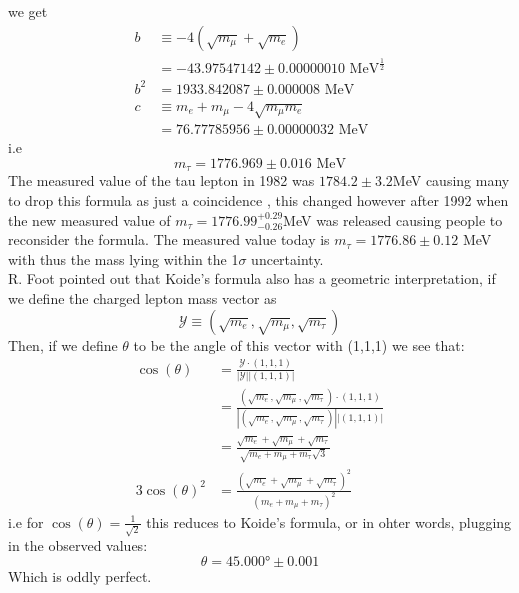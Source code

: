 \documentclass[twoside,twocolumn,11pt]{article} %
\begin{document}
we get 
\begin{align*}
	b &\equiv -4(\sqrt{m_\mu} + \sqrt{m_e})\\
	&= -43.97547142\pm 0.00000010 \text{ MeV}^{\frac{1}{2}}\\
	b^2 &= 1933.842087 \pm 0.000008\text{ MeV}\\
	c &\equiv m_e + m_\mu - 4\sqrt{m_\mu m_e}\\
	&= 76.77785956\pm 0.00000032 \text{ MeV}
\end{align*}
i.e
\begin{equation}
	m_\tau = 1776.969 \pm 0.016\text{ MeV}\label{eq:TauPredictionKoide}
\end{equation}
The measured value of the tau lepton in 1982 was $1784.2\pm 3.2$MeV causing many to drop this formula as just a coincidence \cite{WhatPhysicsKoide}, this changed however after 1992 when the new measured value of $m_\tau = 1776.99^{+0.29}_{-0.26}$MeV was released causing people to reconsider the formula. The measured value today is $m_\tau = 1776.86\pm 0.12$ MeV with thus the mass lying within the 1$\sigma$ uncertainty.   \\
R. Foot \cite{Foot} pointed out that Koide's formula also has a geometric interpretation, if we define the charged lepton mass vector as
\begin{equation}
	\mathcal{Y} \equiv (\sqrt{m_e},\sqrt{m_\mu},\sqrt{m_\tau})
\end{equation}
Then, if we define $\theta$ to be the angle of this vector with (1,1,1) we see that:
\begin{align*}
	\cos(\theta)  &= \frac{\mathcal{Y}\cdot (1,1,1)}{|\mathcal{Y}||(1,1,1)|}\\
	&= \frac{(\sqrt{m_e},\sqrt{m_\mu},\sqrt{m_\tau})\cdot (1,1,1)}{|(\sqrt{m_e},\sqrt{m_\mu},\sqrt{m_\tau})||(1,1,1)|}\\
	&= \frac{\sqrt{m_e} + \sqrt{m_\mu} + \sqrt{m_\tau}}{\sqrt{m_e + m_\mu + m_\tau}\sqrt{3}}\\
	3\cos(\theta)^2 &= \frac{\left(\sqrt{m_e} + \sqrt{m_\mu} + \sqrt{m_\tau}\right)^2}{(m_e + m_\mu + m_\tau)^2}
\end{align*}
i.e for $\cos(\theta)=\frac{1}{\sqrt{2}}$ this reduces to Koide's formula, or in ohter words, plugging in the observed values:
\begin{equation}
	\theta = 45.000\text{°} \pm 0.001
\end{equation}
Which is oddly perfect.
\end{document}
